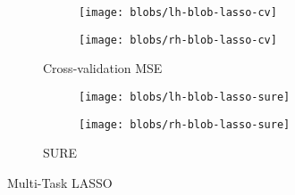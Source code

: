 \begin{figure}[t!]
    \centering
    \begin{subfigure}[t]{0.3\textwidth}
        \centering
        \begin{subfigure}[t]{0.3\textwidth}
            \centering
            \texttt{[image: blobs/lh-blob-lasso-cv]}
        \end{subfigure}
        \hfill
        \begin{subfigure}[t]{0.3\textwidth}
            \centering
            \texttt{[image: blobs/rh-blob-lasso-cv]}
        \end{subfigure}
        \caption{Cross-validation MSE}
        \label{fig:blob-lasso-cv}
    \end{subfigure}
    \vfill
    \begin{subfigure}[t]{0.3\textwidth}
        \begin{subfigure}[t]{0.3\textwidth}
            \centering
            \texttt{[image: blobs/lh-blob-lasso-sure]}
        \end{subfigure}
        \hfill
        \begin{subfigure}[t]{0.3\textwidth}
            \centering
            \texttt{[image: blobs/rh-blob-lasso-sure]}
        \end{subfigure}
        \caption{SURE}
        \label{fig:blob-lasso-sure}
    \end{subfigure}
    \caption{Multi-Task LASSO}
\end{figure}
